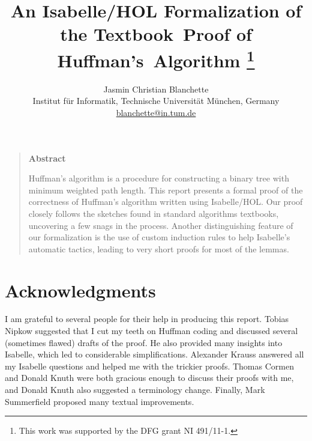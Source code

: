 \documentclass[11pt,a4paper]{article}
\begin{document}
\title{An Isabelle/HOL Formalization of the Textbook~Proof of
       Huffman's~Algorithm%
\thanks{This work was supported by the DFG grant NI 491/11-1.}}

\author{Jasmin Christian Blanchette \\ \small
Institut f\"ur Informatik, Technische Universit\"at M\"unchen, Germany \\[-.2ex] \small
\url{blanchette@in.tum.de}}

\maketitle

\begin{quote}
\begin{center}{\bf\large Abstract}\end{center}

\smallskip

Huffman's algorithm is a procedure for constructing a binary tree with minimum
weighted path length. This report presents a formal proof of the correctness of
Huffman's algorithm written using Isabelle/HOL. Our proof closely follows the
sketches found in standard algorithms textbooks, uncovering a few snags in the
process. Another distinguishing feature of our formalization is the use of
custom induction rules to help Isabelle's automatic tactics, leading to very
short proofs for most of the lemmas.
\end{quote}

\vskip0pt

\tableofcontents



\section*{Acknowledgments}

I am grateful to several people for their help in producing this report.
Tobias Nipkow suggested that I cut my teeth on Huffman coding and
discussed several (sometimes flawed) drafts of the proof. He also
provided many insights into Isabelle, which led to considerable
simplifications. Alexander Krauss answered all my Isabelle questions and
helped me with the trickier proofs. Thomas Cormen and Donald Knuth were
both gracious enough to discuss their proofs with me, and Donald Knuth
also suggested a terminology change. Finally, Mark Summerfield proposed
many textual improvements.
\end{document}
